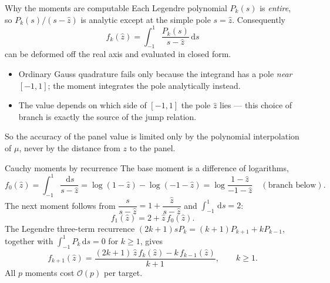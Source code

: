 \documentclass[aspectratio=169,11pt]{beamer}
\newcommand{\cO}{\mathcal{O}}
\newcommand{\dd}{\,\mathrm d}
\begin{document}
\begin{frame}{Why the moments are computable}
\small
Each Legendre polynomial $P_k(s)$ is \emph{entire}, so $P_k(s)/(s-\hat z)$ is
analytic except at the simple pole $s=\hat z$.  Consequently
\[
  f_k(\hat z)=\int_{-1}^{1}\frac{P_k(s)}{s-\hat z}\dd s
\]
can be deformed off the real axis and evaluated in closed form.

\begin{itemize}
  \item Ordinary Gauss quadrature fails only because the integrand has a pole
  \emph{near} $[-1,1]$; the moment integrates the pole analytically instead.
  \item The value depends on which side of $[-1,1]$ the pole $\hat z$ lies ---
  this choice of branch is exactly the source of the jump relation.
\end{itemize}

\vspace{1mm}
So the accuracy of the panel value is limited only by the polynomial
interpolation of $\mu$, never by the distance from $z$ to the panel.
\end{frame}

\begin{frame}{Cauchy moments by recurrence}
\small
The base moment is a difference of logarithms,
\[
  f_0(\hat z)=\int_{-1}^{1}\frac{\dd s}{s-\hat z}
  =\log(1-\hat z)-\log(-1-\hat z)
  =\log\frac{1-\hat z}{-1-\hat z}
  \quad(\text{branch below}).
\]
The next moment follows from $\dfrac{s}{s-\hat z}=1+\dfrac{\hat z}{s-\hat z}$ and
$\int_{-1}^1\dd s=2$:
\[
  f_1(\hat z)=2+\hat z\,f_0(\hat z).
\]
The Legendre three-term recurrence $(2k+1)sP_k=(k+1)P_{k+1}+kP_{k-1}$, together
with $\int_{-1}^1 P_k\dd s=0$ for $k\ge1$, gives
\[
  f_{k+1}(\hat z)=\frac{(2k+1)\,\hat z\,f_k(\hat z)-k\,f_{k-1}(\hat z)}{k+1},
  \qquad k\ge1.
\]
All $p$ moments cost $\cO(p)$ per target.
\end{frame}
\end{document}

